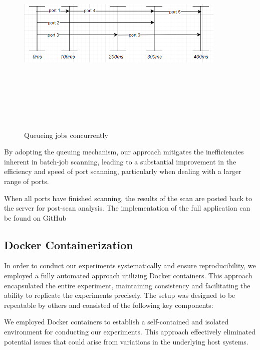 \begin{figure}[htbp]
    \centering
\includegraphics[width=10cm, height=10cm, keepaspectratio]{port_scanning_techniques/img/queue-job.png}
    \caption{Queueing jobs concurrently}
    \label{fig:queue-job}
\end{figure}

By adopting the queuing mechanism, our approach mitigates the inefficiencies inherent in batch-job scanning, leading to a substantial improvement in the efficiency and speed of port scanning, particularly when dealing with a larger range of ports.

When all ports have finished scanning, the results of the scan are posted back to the server for post-scan analysis. The implementation of the full application can be found on GitHub~

\subsection{Docker Containerization}
\label{section:experiment-setup}

In order to conduct our experiments systematically and ensure reproducibility, we employed a fully automated approach utilizing Docker containers. This approach encapsulated the entire experiment, maintaining consistency and facilitating the ability to replicate the experiments precisely. The setup was designed to be repeatable by others and consisted of the following key components:

We employed Docker containers to establish a self-contained and isolated environment for conducting our experiments. This approach effectively eliminated potential issues that could arise from variations in the underlying host systems.

